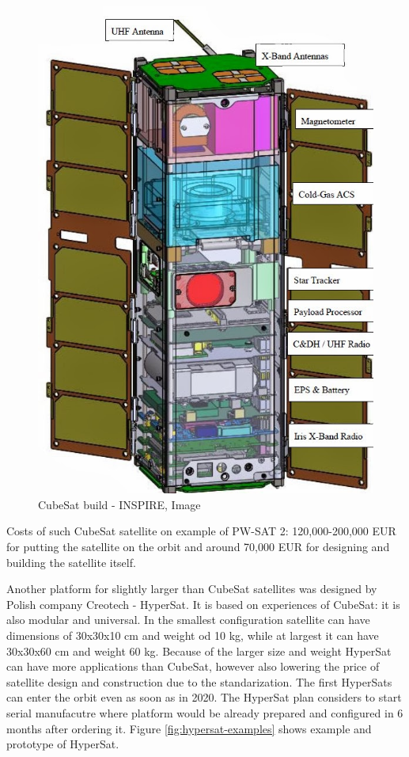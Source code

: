 \documentclass[12pt,a4paper,twoside]{article}
\begin{document}
\begin{figure}[!htbp]
\includegraphics[scale=0.45]{INSPIRE_JPL.jpg}
\centering
\caption[CubeSat build - INSPIRE]{CubeSat build - INSPIRE, Image \cite{cubesat-build}}
\label{fig:cubesat-build}
\end{figure}

Costs of such CubeSat satellite on example of PW-SAT 2: 120,000-200,000 EUR for putting the satellite on the orbit and around 70,000 EUR for designing and building the satellite itself\cite{pw-pw-sat2}.

Another platform for slightly larger than CubeSat satellites was designed by Polish company Creotech - HyperSat\cite{hypersat}. It is based on experiences of CubeSat: it is also modular and universal. In the smallest configuration satellite can have dimensions of 30x30x10 cm and weight od 10 kg, while at largest it can have 30x30x60 cm and weight 60 kg. Because of the larger size and weight HyperSat can have more applications than CubeSat, however also lowering the price of satellite design and construction due to the standarization. The first HyperSats can enter the orbit even as soon as in 2020\cite{hypersat-space24}. The HyperSat plan considers to start serial manufacutre where platform would be already prepared and configured in 6 months after ordering it\cite{platforma-satelitarna-space24}. Figure \ref{fig:hypersat-examples} shows example and prototype of HyperSat.
\end{document}
